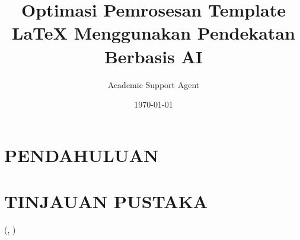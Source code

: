 \documentclass{beamer}
\title{Optimasi Pemrosesan Template LaTeX Menggunakan Pendekatan Berbasis AI}
\author{Academic Support Agent}
\date{\today}
\begin{document}
\maketitle

\begin{abstract}

\end{abstract}

\chapter{PENDAHULUAN}


\chapter{TINJAUAN PUSTAKA}




\usepackage{array}
\usepackage{ragged2e}
\usepackage{graphicx}
\usepackage{pifont}
\usepackage{subfig}
\usepackage{array}
\usepackage[utf8]{inputenc}
\usepackage[english]{babel}
\usepackage[cjk]{kotex}
\usepackage{epsfig}
\usepackage[T1]{fontenc}

\usepackage{longtable}

\usepackage{booktabs}

\usepackage{pstricks}
\usepackage{soul}
\usepackage{hyperref}
\usepackage{xcolor}
\usepackage{etoolbox}
\usepackage{setspace}
\usepackage{cancel}
\usepackage{media9}
\usepackage{multirow}
\usepackage{caption}
\usepackage{tikz}
\usetikzlibrary{calc}
\usetikzlibrary{shapes.multipart}
\usetikzlibrary{shapes,decorations,arrows,shapes,arrows.meta,fit,positioning, automata, positioning}

\usepackage{csquotes}
\usepackage[style=apa,sortcites=true,sorting=ydnt,backend=biber,uniquename=false]{biblatex}

\DeclareCiteCommand{\citeshort}
  {%
   }
  {\ifciteindex
     {}
     {}%
   (,
   {\printdate})
   }

  {}

\end{document}
